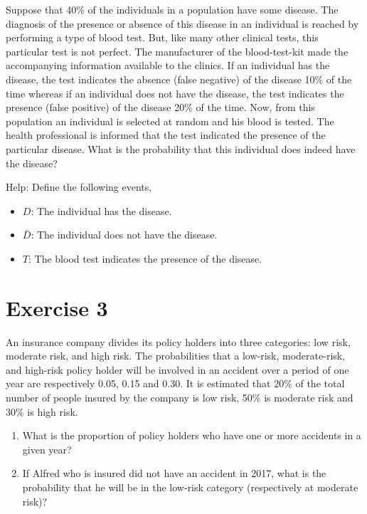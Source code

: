 \documentclass[12pt,thmsa]{article}\usepackage[]{graphicx}\usepackage[]{color}
\begin{document}
Suppose that 40\% of the individuals in a population have some disease. The diagnosis of the presence or absence of this disease in an individual is reached by performing a type of blood test. But, like many other clinical tests, this particular test is not perfect. The manufacturer of the blood-test-kit made the accompanying information available to the clinics. If an individual has the disease, the test indicates the absence (false negative) of the disease 10\% of the time whereas if an individual does not have the disease, the test indicates the presence (false positive) of the disease 20\% of the time. Now, from this population an individual is selected at random and his blood is tested. The health professional is informed that the test indicated the presence of the particular disease. What is the probability that this individual does indeed have the disease?

Help: Define the following events,
\begin{itemize}
\item $ D $: The individual has the disease.
\item $ \bar{D} $: The individual does not have the disease.
\item $ T $: The blood test indicates the presence of the disease.
\end{itemize}


\section*{Exercise 3}

An insurance company divides its policy holders into three categories: low risk, moderate risk, and high risk. The probabilities that a low-risk, moderate-risk, and high-risk policy holder will be involved in an accident over a period of one year are respectively 0.05, 0.15 and 0.30. It is estimated that 20\% of the total number of people insured by the company is low risk, 50\% is moderate risk and 30\% is high risk.

\begin{enumerate}
	\item What is the proportion of policy holders who have one or more accidents in a given year?
	\item If Alfred who is insured did not have an accident in 2017, what is the probability that he will be in the low-risk category (respectively at moderate risk)?
\end{enumerate}
\end{document}
